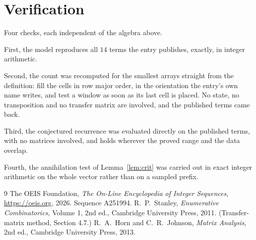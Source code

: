 \documentclass[11pt,a4paper]{article}
\theoremstyle{plain}
\theoremstyle{definition}
\begin{document}
\section{Verification}

Four checks, each independent of the algebra above.

First, the model reproduces all $14$ terms the entry publishes, exactly, in integer
arithmetic.

Second, the count was recomputed for the smallest arrays straight from the definition: fill the
cells in row major order, in the orientation the entry's own name writes, and test a window as
soon as its last cell is placed. No state, no transposition and no transfer matrix are
involved, and the published terms came back.

Third, the conjectured recurrence was evaluated directly on the published terms, with no
matrices involved, and holds wherever the proved range and the data overlap.

Fourth, the annihilation test of Lemma~\ref{lem:crit} was carried out in exact integer
arithmetic on the whole vector rather than on a sampled prefix.

\begin{thebibliography}{9}
 The OEIS Foundation, \emph{The On-Line Encyclopedia of Integer
Sequences}, \url{https://oeis.org}, 2026. Sequence A251994.
 R.~P.~Stanley, \emph{Enumerative Combinatorics}, Volume 1, 2nd ed.,
Cambridge University Press, 2011. (Transfer-matrix method, Section 4.7.)
 R.~A.~Horn and C.~R.~Johnson, \emph{Matrix Analysis}, 2nd ed., Cambridge
University Press, 2013.
\end{thebibliography}
\end{document}

